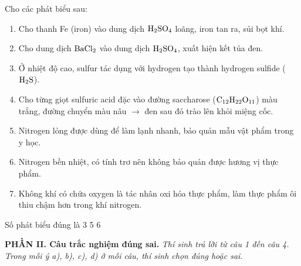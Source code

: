 \documentclass[12pt,a4paper]{article}
\begin{document}
\begin{ex}
Cho các phát biểu sau:
\begin{enumerate}[(1)]
	\item Cho thanh Fe (iron) vào dung dịch $\ce{H2SO4}$ loãng, iron tan ra, sủi bọt khí.
	\item Cho dung dịch $\ce{BaCl2}$ vào dung dịch $\ce{H2SO4}$, xuất hiện kết tủa đen.
	\item Ở nhiệt độ cao, sulfur tác dụng với hydrogen tạo thành hydrogen sulfide ($\ce{H2S}$).
	\item Cho từng giọt sulfuric acid đặc vào đường saccharose ($\ce{C12H22O11}$) màu trắng, đường chuyển màu nâu $\rightarrow$ đen sau đó trào lên khỏi miệng cốc.
	\item Nitrogen lỏng được dùng để làm lạnh nhanh, bảo quản mẫu vật phẩm trong y học.
	\item Nitrogen bền nhiệt, có tính trơ nên không bảo quản được hương vị thực phẩm.
	\item Không khí có chứa oxygen là tác nhân oxi hóa thực phẩm, làm thực phẩm ôi thiu chậm hơn trong khí nitrogen.
\end{enumerate}
Số phát biểu đúng là
\choice
{3}
{}
{5}
{6}

\end{ex}


\vspace{0.3cm}
\noindent\textbf{\large PHẦN II. Câu trắc nghiệm đúng sai.}
\textit{Thí sinh trả lời từ câu 1 đến câu 4. Trong mỗi ý a), b), c), d) ở mỗi câu, thí sinh chọn đúng hoặc sai.}
\vspace{0.2cm}
\end{document}

